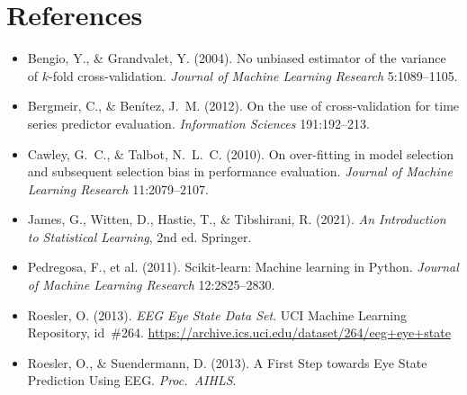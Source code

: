 \documentclass[11pt]{article}
\begin{document}
\section*{References}
{\small
\begin{itemize}[leftmargin=1.5em,label={},itemsep=2pt,topsep=1pt]
  \item Bengio, Y., \& Grandvalet, Y. (2004). No unbiased estimator of the
    variance of $k$-fold cross-validation. \emph{Journal of Machine Learning
    Research} 5:1089--1105.
  \item Bergmeir, C., \& Ben\'itez, J.~M. (2012). On the use of
    cross-validation for time series predictor evaluation.
    \emph{Information Sciences} 191:192--213.
  \item Cawley, G.~C., \& Talbot, N.~L.~C. (2010). On over-fitting in model
    selection and subsequent selection bias in performance evaluation.
    \emph{Journal of Machine Learning Research} 11:2079--2107.
  \item James, G., Witten, D., Hastie, T., \& Tibshirani, R. (2021).
    \emph{An Introduction to Statistical Learning}, 2nd ed. Springer.
  \item Pedregosa, F., et al. (2011). Scikit-learn: Machine learning in
    Python. \emph{Journal of Machine Learning Research} 12:2825--2830.
  \item Roesler, O. (2013). \emph{EEG Eye State Data Set}. UCI Machine
    Learning Repository, id~\#264.
    \url{https://archive.ics.uci.edu/dataset/264/eeg+eye+state}
  \item Roesler, O., \& Suendermann, D. (2013). A First Step towards Eye
    State Prediction Using EEG. \emph{Proc.\ AIHLS}.
\end{itemize}
}
\end{document}
